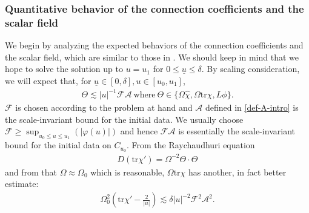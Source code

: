 \documentclass[11pt,reqno]{amsart}
\theoremstyle{definition}
\numberwithin{equation}{section}
\newcommand{\tr}{\mathrm{tr}}
\def\chih{\widehat{\chi}}
\def\tr{\mathrm{tr}}
\def\ub{\underline{u}}
\begin{document}
\subsubsection{Quantitative behavior of the connection coefficients and the scalar field}
 We begin by analyzing the expected behaviors of the connection coefficients and the scalar field, which are similar to those in \cite{An-Luk}. We should keep in mind that we hope to solve the solution up to $u=u_1$ for $0\le\ub\le\delta$. By scaling consideration, we will expect that, for $\ub\in[0,\delta], u\in[u_0,u_1]$, 
\begin{align}\label{estimate-Theta-intro}
\Theta\lesssim|u|^{-1}\mathscr{F}\mathcal{A}\ \text{where}\ \Theta\in\{\Omega\chih, \Omega\tr\chi, L\phi\}.
\end{align}
$\mathscr{F}$ is chosen according to the problem at hand and $\mathcal{A}$ defined in \eqref{def-A-intro} is the scale-invariant bound for the initial data. We usually choose $\mathscr{F}\ge\displaystyle\sup_{u_0\le u\le u_1}\left(|\varphi(u)|\right)$ and hence $\mathscr{F}\mathcal{A}$ is essentially the scale-invariant bound for the initial data on $C_{u_0}$. From the Raychaudhuri equation
\begin{align*}
D(\tr\chi')=\Omega^{-2}\Theta\cdot\Theta
\end{align*}
and from that $\Omega\approx\Omega_0$ which is reasonable, $\Omega\tr\chi$ has another, in fact better estimate:
\begin{align*}
\Omega_0^2(\tr\chi'-\frac{2}{|u|})\lesssim\delta|u|^{-2}\mathscr{F}^2\mathcal{A}^2.
\end{align*}
\end{document}
